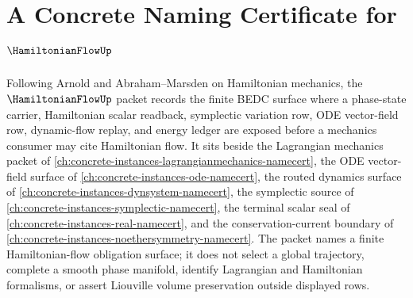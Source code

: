 \chapter{A Concrete Naming Certificate for $\HamiltonianFlowUp$}
\label{ch:concrete-instances-hamiltonian-flow-namecert}

Following Arnold and Abraham--Marsden on Hamiltonian mechanics, the $\HamiltonianFlowUp$ packet records the finite BEDC surface where a phase-state carrier, Hamiltonian scalar readback, symplectic variation row, ODE vector-field row, dynamic-flow replay, and energy ledger are exposed before a mechanics consumer may cite Hamiltonian flow. It sits beside the Lagrangian mechanics packet of \autoref{ch:concrete-instances-lagrangianmechanics-namecert}, the ODE vector-field surface of \autoref{ch:concrete-instances-ode-namecert}, the routed dynamics surface of \autoref{ch:concrete-instances-dynsystem-namecert}, the symplectic source of \autoref{ch:concrete-instances-symplectic-namecert}, the terminal scalar seal of \autoref{ch:concrete-instances-real-namecert}, and the conservation-current boundary of \autoref{ch:concrete-instances-noethersymmetry-namecert}. The packet names a finite Hamiltonian-flow obligation surface; it does not select a global trajectory, complete a smooth phase manifold, identify Lagrangian and Hamiltonian formalisms, or assert Liouville volume preservation outside displayed rows.

